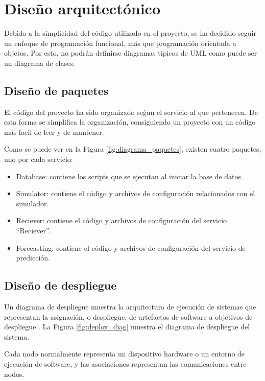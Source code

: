 
\section{Diseño arquitectónico}


Debido a la simplicidad del código utilizado en el proyecto, se ha decidido seguir un enfoque de programación 
funcional, más que programación orientada a objetos. Por esto, no podrán definirse diagramas típicos de UML como 
puede ser un diagrama de clases.

\subsection{Diseño de paquetes}

El código del proyecto ha sido organizado seǵun el servicio al que pertenecen. De esta forma se simplifica la organización,
consiguiendo un proyecto con un código más facil de leer y de mantener.


Como se puede ver en la Figura \ref{fig:diagrama_paquetes}, existen cuatro paquetes, uno por cada servicio:
\begin{itemize}
    \item Database: contiene los scripts que se ejecutan al iniciar la base de datos.
    \item Simulator: contiene el código y archivos de configuración relacionados con el simulador.
    \item Reciever: contiene el código y archivos de configuración del servicio ``Reciever''.
    \item Forecasting: contiene el código y archivos de configuración del servicio de predicción.
\end{itemize}

\subsection{Diseño de despliegue}

Un diagrama de despliegue muestra la arquitectura de ejecución de sistemas que representan la asignación, o despliegue,
de artefactos de software a objetivos de despliegue \cite{uml:deploy}. La Figura \ref{fig:deploy_diag} muestra el 
diagrama de despliegue del sistema.

Cada nodo normalmente representa un dispositivo hardware o un entorno de ejecución de software, y las asociaciones 
representan las comunicaciones entre nodos.

